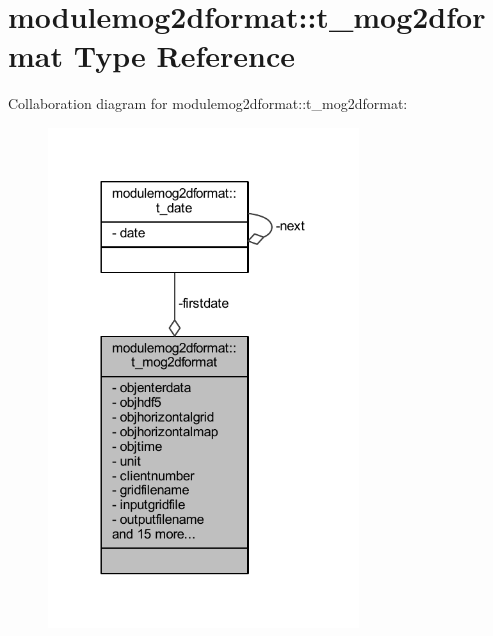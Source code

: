 \hypertarget{structmodulemog2dformat_1_1t__mog2dformat}{}\section{modulemog2dformat\+:\+:t\+\_\+mog2dformat Type Reference}
\label{structmodulemog2dformat_1_1t__mog2dformat}


Collaboration diagram for modulemog2dformat\+:\+:t\+\_\+mog2dformat\+:\nopagebreak
\begin{figure}[H]
\begin{center}
\leavevmode
\includegraphics[width=233pt]{structmodulemog2dformat_1_1t__mog2dformat__coll__graph}
\end{center}
\end{figure}
